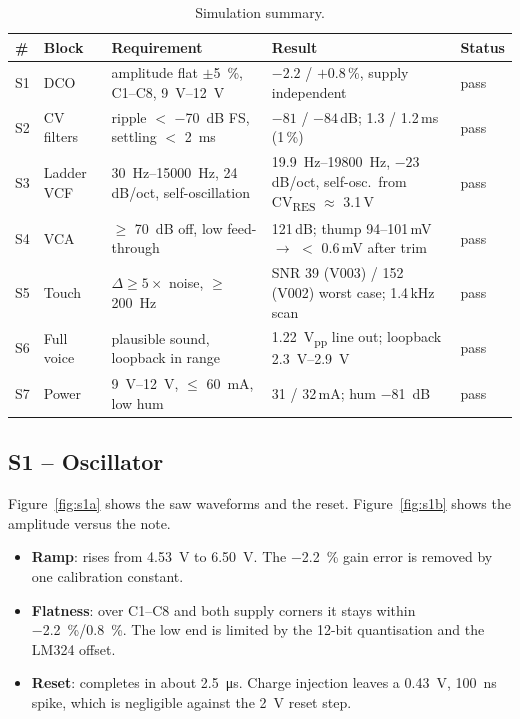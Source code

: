 \documentclass[11pt,a4paper]{article}
\newcommand{\sub}[1]{\textsubscript{#1}}
\begin{document}
\begin{table}[h]
\centering\small
\caption{Simulation summary.}\label{tab:simsum}
\begin{tabularx}{\textwidth}{@{}l l X X l@{}}
\toprule
\# & Block & Requirement & Result & Status \\
\midrule
S1 & DCO & amplitude flat $\pm$\SI{5}{\percent}, C1--C8, \SIrange{9}{12}{V} & $-2.2$ / $+0.8$\,\%, supply independent & pass \\
S2 & CV filters & ripple $<$ \SI{-70}{dB} FS, settling $<$ \SI{2}{ms} & $-81$ / $-84$\,dB; 1.3 / 1.2\,ms (1\,\%) & pass \\
S3 & Ladder VCF & \SIrange{30}{15000}{Hz}, 24\,dB/oct, self-oscillation & \SIrange{19.9}{19800}{Hz}, $-23$\,dB/oct, self-osc.\ from CV\sub{RES} $\approx$ 3.1\,V & pass \\
S4 & VCA & $\geq$ \SI{70}{dB} off, low feed-through & 121\,dB; thump 94--101\,mV $\to$ $<$ 0.6\,mV after trim & pass \\
S5 & Touch & $\Delta \geq 5\times$ noise, $\geq$ \SI{200}{Hz} & SNR 39 (V003) / 152 (V002) worst case; 1.4\,kHz scan & pass \\
S6 & Full voice & plausible sound, loopback in range & \SI{1.22}{V_{pp}} line out; loopback \SIrange{2.3}{2.9}{V} & pass \\
S7 & Power & \SIrange{9}{12}{V}, $\leq$ \SI{60}{mA}, low hum & 31 / 32\,mA; hum \SI{-81}{dB} & pass \\
\bottomrule
\end{tabularx}
\end{table}

\subsection{S1 -- Oscillator}
Figure~\ref{fig:s1a} shows the saw waveforms and the reset. Figure~\ref{fig:s1b} shows the amplitude versus
the note.
\begin{itemize}
  \item \textbf{Ramp}: rises from \SI{4.53}{V} to \SI{6.50}{V}. The \SI{-2.2}{\percent} gain error is
    removed by one calibration constant.
  \item \textbf{Flatness}: over C1--C8 and both supply corners it stays within
    \SI{-2.2}{\percent}/\SI{+0.8}{\percent}. The low end is limited by the 12-bit quantisation and the
    LM324 offset.
  \item \textbf{Reset}: completes in about \SI{2.5}{\micro s}. Charge injection leaves a \SI{0.43}{V},
    \SI{100}{ns} spike, which is negligible against the \SI{2}{V} reset step.
\end{itemize}
\end{document}
